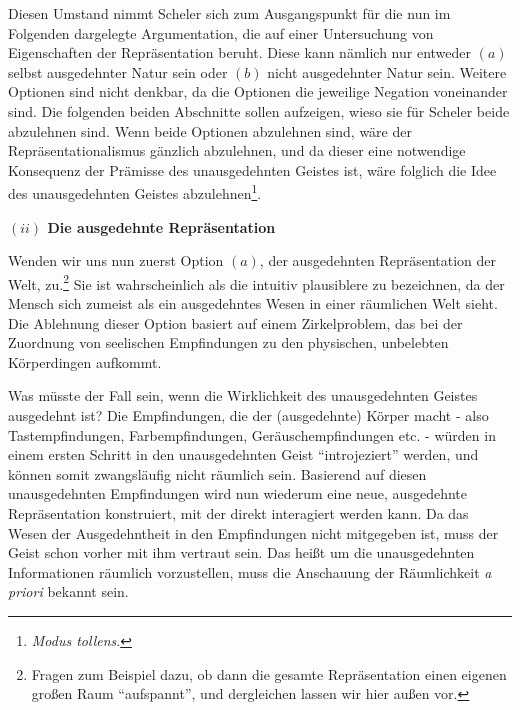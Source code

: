 \documentclass[a4paper, 12pt]{article}
\begin{document}
\begin{onehalfspace}
Diesen Umstand nimmt Scheler sich zum Ausgangspunkt für die nun im Folgenden dargelegte Argumentation, die auf einer Untersuchung von Eigenschaften der Repräsentation beruht. Diese kann nämlich nur entweder $(a)$ selbst ausgedehnter Natur sein oder $(b)$ nicht ausgedehnter Natur sein. Weitere Optionen sind nicht denkbar, da die Optionen die jeweilige Negation voneinander sind. Die folgenden beiden Abschnitte sollen aufzeigen, wieso sie für Scheler beide abzulehnen sind. Wenn beide Optionen abzulehnen sind, wäre der Repräsentationalismus gänzlich abzulehnen, und da dieser eine notwendige Konsequenz der Prämisse des unausgedehnten Geistes ist, wäre folglich die Idee des unausgedehnten Geistes abzulehnen\footnote{\emph{Modus tollens}.}.

\vspace{5mm}
\noindent\textbf{$(ii)$ Die ausgedehnte Repräsentation}


\noindent Wenden wir uns nun zuerst Option $(a)$, der ausgedehnten Repräsentation der Welt, zu.\footnote{Fragen zum Beispiel dazu, ob dann die gesamte Repräsentation einen eigenen großen Raum "`aufspannt"', und dergleichen lassen wir hier außen vor.} Sie ist wahrscheinlich als die intuitiv plausiblere zu bezeichnen, da der Mensch sich zumeist als ein ausgedehntes Wesen in einer räumlichen Welt sieht. Die Ablehnung dieser Option basiert auf einem Zirkelproblem, das bei der Zuordnung von seelischen Empfindungen zu den physischen, unbelebten Körperdingen aufkommt.


Was müsste der Fall sein, wenn die Wirklichkeit des unausgedehnten Geistes ausgedehnt ist? Die Empfindungen, die der (ausgedehnte) Körper macht - also Tastempfindungen, Farbempfindungen, Geräuschempfindungen etc. - würden in einem ersten Schritt in den unausgedehnten Geist "`introjeziert"' werden, und können somit zwangsläufig nicht räumlich sein. Basierend auf diesen unausgedehnten Empfindungen wird nun wiederum eine neue, ausgedehnte Repräsentation konstruiert, mit der direkt interagiert werden kann. Da das Wesen der Ausgedehntheit in den Empfindungen nicht mitgegeben ist, muss der Geist schon vorher mit ihm vertraut sein. Das heißt um die unausgedehnten Informationen räumlich vorzustellen, muss die Anschauung der Räumlichkeit \emph{a priori} bekannt sein. 


\end{onehalfspace}
\end{document}
